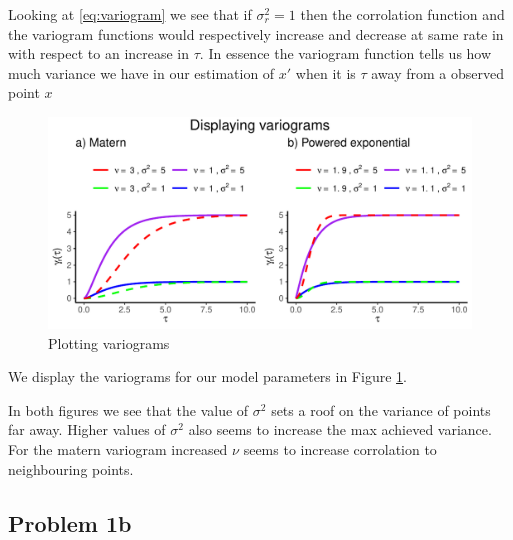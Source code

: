 \documentclass[]{article}
\begin{document}
Looking at \eqref{eq:variogram} we see that if \(\sigma_r^2 = 1\) then
the corrolation function and the variogram functions would respectively
increase and decrease at same rate in with respect to an increase in
\(\tau\). In essence the variogram function tells us how much variance
we have in our estimation of \(x'\) when it is \(\tau\) away from a
observed point \(x\)

\begin{figure}
\centering
\includegraphics{Exercise-1_files/figure-latex/fig1a2-1.pdf}
\caption{\label{fig:fig1a2} Plotting variograms}
\end{figure}

We display the variograms for our model parameters in Figure
\ref{fig:fig1a2}.

In both figures we see that the value of \(\sigma^2\) sets a roof on the
variance of points far away. Higher values of \(\sigma^2\) also seems to
increase the max achieved variance. For the matern variogram increased
\(\nu\) seems to increase corrolation to neighbouring points.

\newpage

\hypertarget{problem-1b}{%
\subsection{Problem 1b}\label{problem-1b}}
\end{document}
